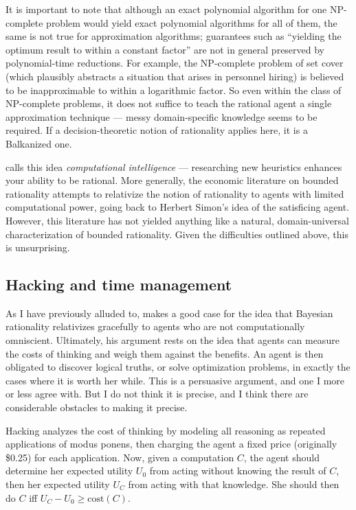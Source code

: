 \documentclass[letterpaper,12pt]{article}
\begin{document}
It is important to note that although an exact polynomial algorithm for one NP-complete problem would yield exact polynomial algorithms for all of them, the same is not true for approximation algorithms; guarantees such as ``yielding the optimum result to within a constant factor'' are not in general preserved by polynomial-time reductions. For example, the NP-complete problem of set cover (which plausibly abstracts a situation that arises in personnel hiring) is believed to be inapproximable to within a logarithmic factor. So even within the class of NP-complete problems, it does not suffice to teach the rational agent a single approximation technique --- messy domain-specific knowledge seems to be required. If a decision-theoretic notion of rationality applies here, it is a Balkanized one.

\cite{tsang2008} calls this idea \emph{computational intelligence} --- researching new heuristics enhances your ability to be rational. More generally, the economic literature on bounded rationality attempts to relativize the notion of rationality to agents with limited computational power, going back to Herbert Simon's idea of the satisficing agent. However, this literature has not yielded anything like a natural, domain-universal characterization of bounded rationality. Given the difficulties outlined above, this is unsurprising.

\subsection{Hacking and time management}
\label{hackingSection}
As I have previously alluded to, \cite{hacking1967} makes a good case for the idea that Bayesian rationality relativizes gracefully to agents who are not computationally omniscient. Ultimately, his argument rests on the idea that agents can measure the costs of thinking and weigh them against the benefits. An agent is then obligated to discover logical truths, or solve optimization problems, in exactly the cases where it is worth her while. This is a persuasive argument, and one I more or less agree with. But I do not think it is precise, and I think there are considerable obstacles to making it precise.

Hacking analyzes the cost of thinking by modeling all reasoning as repeated applications of modus ponens, then charging the agent a fixed price (originally \$0.25) for each application. Now, given a computation $C$, the agent should determine her expected utility $U_0$ from acting without knowing the result of $C$, then her expected utility $U_C$ from acting with that knowledge. She should then do $C$ iff $U_C - U_0 \geq \text{cost}(C)$.
\end{document}
